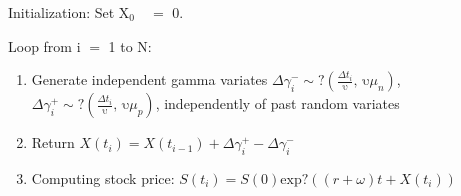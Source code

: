 Initialization: Set X$_{0} \quad =$ 0.

Loop from i $=$ 1 to N:

\begin{enumerate}
\item Generate independent gamma variates $\Delta \gamma_{i}^{-}\sim ?\left( \frac{\Delta t_{i}}{\mathrm{\upsilon }},\, \mathrm{\upsilon }\mu_{n} \right)$, $\Delta \gamma_{i}^{+}\sim ?\left( \frac{\Delta t_{i}}{\mathrm{\upsilon }},\, \mathrm{\upsilon }\mu_{p} \right)$, independently of past random variates
\item Return $X\left( t_{i} \right)=X\left( t_{i-1} \right)+\Delta \gamma_{i}^{+}-\Delta \gamma_{i}^{-}$
\item Computing stock price: $S\left( t_{i} \right)=S\left( 0 \right)\mathrm{exp?}\left( \left( r+\omega \right)t+X\left( t_{i} \right) \right)$
\end{enumerate}


